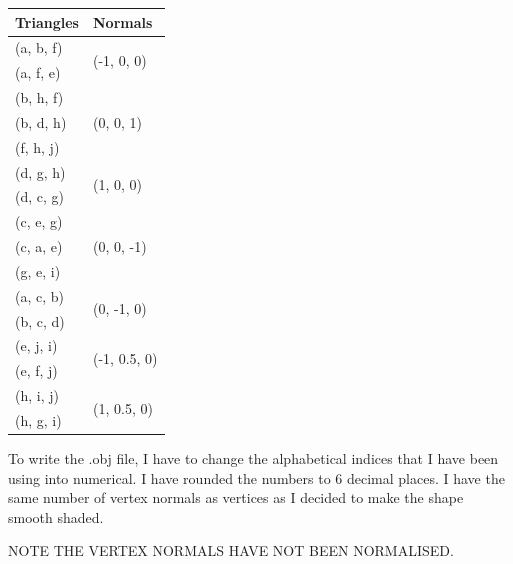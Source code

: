 \documentclass[10pt]{report}
\begin{document}
\begin{table}
    \begin{tabular}{|l|l|} 
    \hline
    \textbf{ Triangles } & \textbf{Normals }              \\ 
    \hline
    (a, b, f)            & \multirow{2}{*}{(-1, 0, 0)}    \\
    (a, f, e)            &                                \\ 
    \hline
    (b, h, f)            & \multirow{3}{*}{(0, 0, 1)}     \\
    (b, d, h)            &                                \\
    (f, h, j)            &                                \\ 
    \hline
    (d, g, h)            & \multirow{2}{*}{(1, 0, 0)}     \\
    (d, c, g)            &                                \\ 
    \hline
    (c, e, g)            & \multirow{3}{*}{(0, 0, -1)}    \\
    (c, a, e)            &                                \\
    (g, e, i)            &                                \\ 
    \hline
    (a, c, b)            & \multirow{2}{*}{(0, -1, 0)}    \\
    (b, c, d)            &                                \\ 
    \hline
    (e, j, i)            & \multirow{2}{*}{(-1, 0.5, 0)}  \\
    (e, f, j)            &                                \\ 
    \hline
    (h, i, j)            & \multirow{2}{*}{(1, 0.5, 0)}   \\
    (h, g, i)            &                                \\
    \hline
    \end{tabular}
\end{table}

\newpage

To write the .obj file, I have to change the alphabetical indices that I have been using into numerical. I have rounded the numbers to 6 decimal places. I have the same number of vertex normals as vertices as I decided to make the shape smooth shaded. 

NOTE THE VERTEX NORMALS HAVE NOT BEEN NORMALISED.
\end{document}

